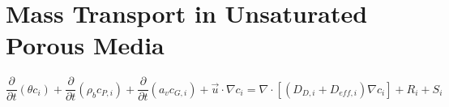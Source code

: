 \section{Mass Transport in Unsaturated Porous Media}\label{sec:mass_transport}

\begin{equation}
  \frac{\partial}{\partial t} (\theta c_i) +
  \frac{\partial}{\partial t} (\rho_b c_{P,i}) +
  \frac{\partial}{\partial t} (a_v c_{G,i}) +
  \vec{u} \cdot \nabla c_i =
  \nabla \cdot [(D_{D,i} + D_{eff,i}) \nabla c_i] +
  R_i + S_i
\end{equation}
